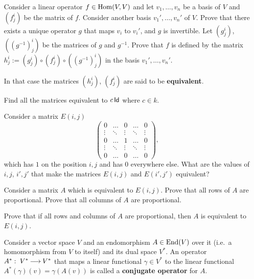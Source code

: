 \documentclass[12pt]{article}
\begin{document}
\begin{zadacha}
  Consider a linear operator $f\in\operatorname{Hom}(V,V)$ and let $v_1, \dots, v_n$
  be a basis of $V$ and $(f^i_j)$ be the matrix of $f$.  Consider
  another basis $v_1', \dots, v_n'$ of $V$. Prove that there exists a
  unique operator $g$ that maps $v_i$ to $v_i'$, and $g$ is
  invertible. Let $(g^i_j)$, $((g^{-1})^i_j)$ be the matrices of $g$
  and $g^{-1}$. Prove that $f$ is defined by the matrix $h^i_j:=
  (g^i_j)\circ(f^i_j) \circ((g^{-1})^i_j)$ in the basis $v_1', \dots,
  v_n'$.
\end{zadacha}

\begin{opredelenie}
In that case the matrices $(h^i_j)$, $(f^i_j)$ are said to be {\bf
  equivalent}. 
\end{opredelenie}

\begin{zadacha}
Find all the matrices equivalent to $c\operatorname{\sf Id}$ where $c\in k$.
\end{zadacha}

\begin{zadacha}[!]
Consider a matrix $E(i,j)$ 
$$
\begin{pmatrix}
0 &\dots&0&\dots &0\\
\vdots &\ddots & \vdots &\ddots & \vdots\\
0 & \dots &1 &\dots &0\\
\vdots &\ddots & \vdots &\ddots & \vdots\\
0 &\dots&0&\dots &0
\end{pmatrix},
$$
which has $1$ on the position $i,j$ and has $0$ everywhere else. What
are the values of $i, j$, $i',j'$ that make the matrices $E(i,j)$ and
$E(i',j')$ equivalent?
\end{zadacha}

\begin{zadacha}[!] 
Consider a matrix $A$ which is equivalent to $E(i,j)$.
Prove that all rows of $A$ are proportional.
Prove that all columns of $A$ are proportional.
\end{zadacha}

\begin{zadacha}[*]
Prove that if all rows and columns of $A$ are proportional, then $A$
is equivalent to $E(i,j)$.
\end{zadacha}

\begin{opredelenie}
  Consider a vector space $V$ and an endomorphism $A \in \operatorname{End}(V)$ over it
  (i.e.\ a homomorphism from $V$ to itself) and its dual space $V^*$.
  An operator $A^*:\; V^*{\:\longrightarrow\:} V^*$ that maps a linear functional
  $\gamma\in V^*$ to the linear functional $A^*(\gamma)(v) =
  \gamma(A(v))$ is called a {\bf conjugate operator} for $A$.
\end{opredelenie}
\end{document}

